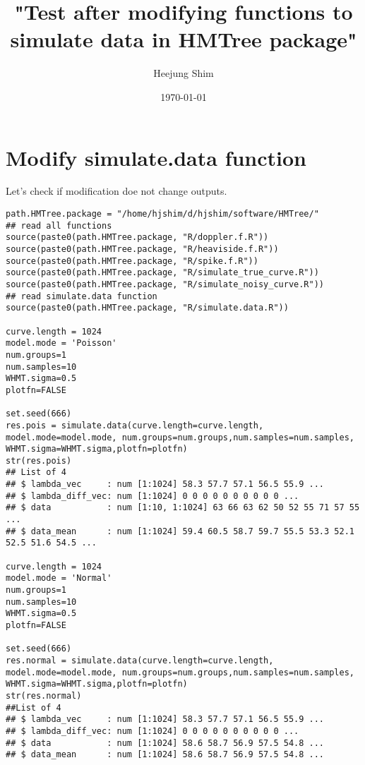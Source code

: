 \documentclass[11pt]{article}
\author{Heejung Shim}
\date{\today}
\title{"Test after modifying functions to simulate data in HMTree package"}
\begin{document}
\maketitle
\tableofcontents


\section{Modify simulate.data function}
\label{sec-1}
Let's check if modification doe not change outputs. 
\begin{lstlisting}
path.HMTree.package = "/home/hjshim/d/hjshim/software/HMTree/"
## read all functions
source(paste0(path.HMTree.package, "R/doppler.f.R"))
source(paste0(path.HMTree.package, "R/heaviside.f.R"))
source(paste0(path.HMTree.package, "R/spike.f.R"))
source(paste0(path.HMTree.package, "R/simulate_true_curve.R"))
source(paste0(path.HMTree.package, "R/simulate_noisy_curve.R"))
## read simulate.data function 
source(paste0(path.HMTree.package, "R/simulate.data.R"))

curve.length = 1024
model.mode = 'Poisson' 
num.groups=1
num.samples=10
WHMT.sigma=0.5
plotfn=FALSE

set.seed(666)
res.pois = simulate.data(curve.length=curve.length, model.mode=model.mode, num.groups=num.groups,num.samples=num.samples, WHMT.sigma=WHMT.sigma,plotfn=plotfn)
str(res.pois)
## List of 4
## $ lambda_vec     : num [1:1024] 58.3 57.7 57.1 56.5 55.9 ...
## $ lambda_diff_vec: num [1:1024] 0 0 0 0 0 0 0 0 0 0 ...
## $ data           : num [1:10, 1:1024] 63 66 63 62 50 52 55 71 57 55 ...
## $ data_mean      : num [1:1024] 59.4 60.5 58.7 59.7 55.5 53.3 52.1 52.5 51.6 54.5 ...

curve.length = 1024
model.mode = 'Normal' 
num.groups=1
num.samples=10
WHMT.sigma=0.5
plotfn=FALSE
 
set.seed(666) 
res.normal = simulate.data(curve.length=curve.length, model.mode=model.mode, num.groups=num.groups,num.samples=num.samples, WHMT.sigma=WHMT.sigma,plotfn=plotfn)
str(res.normal)
##List of 4
## $ lambda_vec     : num [1:1024] 58.3 57.7 57.1 56.5 55.9 ...
## $ lambda_diff_vec: num [1:1024] 0 0 0 0 0 0 0 0 0 0 ...
## $ data           : num [1:1024] 58.6 58.7 56.9 57.5 54.8 ...
## $ data_mean      : num [1:1024] 58.6 58.7 56.9 57.5 54.8 ...


\end{lstlisting}
\end{document}

